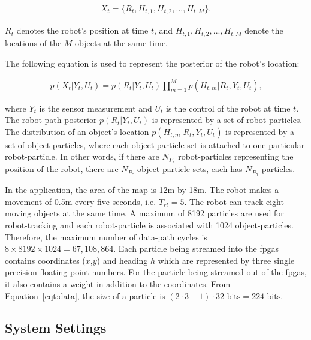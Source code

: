 \begin{equation}
\begin{aligned}
X_t = \{R_t, H_{t,1}, H_{t,2}, ..., H_{t,M}\} \mbox{.}
\end{aligned}
\end{equation}

$R_t$ denotes the robot's position at time $t$, and $H_{t,1}, H_{t,2}, ..., H_{t,M}$ denote the locations of the $M$ objects at the same time.

The following equation is used to represent the posterior of the robot's location:

\begin{equation}
\begin{aligned}
p(X_t|Y_t,U_t) = p(R_t|Y_t,U_t) \prod_{m=1}^M p(H_{t,m}|R_t,Y_t,U_t) \mbox{,}
\end{aligned}
\end{equation}

where $Y_t$ is the sensor measurement and $U_t$ is the control of the robot at time $t$.
The robot path posterior $p(R_t|Y_t,U_t)$ is represented by a set of robot-particles.
The distribution of an object's location $p(H_{t,m}|R_t,Y_t,U_t)$ is represented by a set of object-particles, where each object-particle set is attached to one particular robot-particle.
In other words, if there are ${N_{P_r}}$ robot-particles representing the position of the robot, there are ${N_{P_r}}$ object-particle sets, each has ${N_{P_h}}$ particles.

In the application, the area of the map is 12m by 18m.
The robot makes a movement of 0.5m every five seconds, i.e. $T_{rt} = 5$.
The robot can track eight moving objects at the same time.
A maximum of 8192 particles are used for robot-tracking and each robot-particle is associated with 1024 object-particles.
Therefore, the maximum number of data-path cycles is $8 \times 8192 \times 1024=67,108,864$.
Each particle being streamed into the \glspl{fpga} contains coordinates ($x$,$y$) and heading $h$ which are represented by three single precision floating-point numbers.
For the particle being streamed out of the \glspl{fpga}, it also contains a weight in addition to the coordinates.
From Equation~\ref{eqt:data}, the size of a particle is $(2 \cdot 3 + 1) \cdot 32 \mbox{ bits} = 224 \mbox{ bits}$.

\subsection{System Settings}

